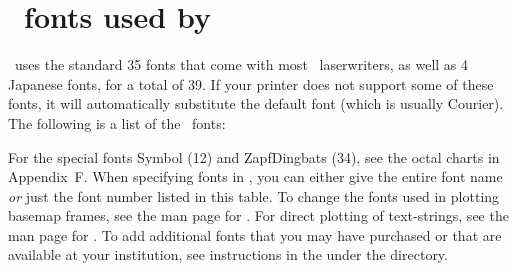 %
%
\chapter{\PS\ fonts used by \gmt}
\thispagestyle{headings}

\GMT\ uses the standard 35 fonts that come with most
\PS\ laserwriters, as well as 4 Japanese fonts, for a total
of 39.  If your printer does not support
some of these fonts, it will automatically substitute the
default font (which is usually Courier).  The following is
a list of the \GMT\ fonts: \\ 


For the special fonts Symbol (12) and ZapfDingbats (34), see the
octal charts in Appendix~F.  When specifying fonts in \GMT, you can
either give the entire font name \emph{or} just the font number listed in
this table.  To change the fonts used in plotting basemap frames, see the man
page for .  For direct plotting of text-strings,
see the man page for .  To add additional fonts that you
may have purchased or that are available at your institution, see instructions
in the  under the  directory.
